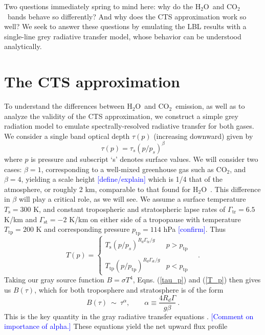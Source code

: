 \documentclass[10pt]{article}
\newcommand{\comment}[1]{\textcolor{blue}{[{#1}]}}
\newcommand{\beqn}{\begin{equation}}
\newcommand{\eeqn}{\end{equation}}
\newcommand{\eqnref}[1]{(\ref{#1})}
\newcommand{\cotwo}{\ensuremath{\mathrm{CO_2}}}
\newcommand{\htwo}{\ensuremath{\mathrm{H_2O}}}
\newcommand{\taus}{\ensuremath{\tau_s}}
\newcommand{\Ts}{\ensuremath{T_\mathrm{s}}}
\newcommand{\ps}{\ensuremath{p_s}}
\newcommand{\Ttp}{\ensuremath{T_\mathrm{tp}}}
\newcommand{\ptp}{\ensuremath{p_\mathrm{tp}}}
\newcommand{\gammatr}{\ensuremath{\Gamma_\mathrm{tr}}}
\newcommand{\gammast}{\ensuremath{\Gamma_\mathrm{st}}}
\begin{document}
Two questions immediately spring to mind here: why do the \htwo\ and \cotwo\ bands behave so differently? And why does the CTS approximation work so well? We seek to answer these questions by emulating the LBL results with a single-line grey radiative transfer model, whose behavior can be understood analytically. 

\section{The CTS approximation}
To understand the differences between \htwo\ and \cotwo\ emission, as well as to analyze the validity of the CTS approximation, we construct a simple grey radiation model to emulate spectrally-resolved radiative transfer for both gases. We consider a single band optical depth $\tau(p)$ (increasing downward) given by
\beqn
	\tau(p) = \taus(p/\ps)^\beta
	\label{tau_p}
\eeqn
where $p$ is pressure and subscript `s' denotes surface values. We will consider two cases: $\beta = 1$, corresponding to a well-mixed greenhouse gas such as  \cotwo, and $\beta = 4$, yielding a scale height \comment{define/explain} which is 1/4 that of the atmosphere, or roughly 2 km, comparable to that found for \htwo\   \citep{romps2014}. This difference in $\beta$ will play a critical role, as we will see. We assume a surface temperature $\Ts=300$ K, and constant tropospheric and stratospheric lapse rates of $\gammatr = 6.5$ K/km and $\gammast = -2$ K/km on either side of a tropopause with temperature $\Ttp=200$ K and corresponding  pressure $\ptp = 114$ hPa \comment{confirm}.  Thus  
\beqn
	T(p) = \left\{ \begin{array}{cc} \Ts(p/\ps)^{R_d \gammatr/g} & p > \ptp \\
																		 & \\
												 \Ttp(p/\ptp)^{R_d \gammast/g} & p < \ptp 
						\end{array} \right. \quad .
	\label{T_p}
\eeqn
Taking our gray source function $B=\sigma T^4$, Eqns. \eqnref{tau_p} and \eqnref{T_p} then gives us $B(\tau)$, which for both troposphere and stratosphere is of the form
\beqn
	B(\tau) \ \sim \  \tau^\alpha, \quad \quad \alpha \equiv \frac{4R_d\Gamma}{g\beta}\ .
	\label{B_tau}
\eeqn
This  is the key quantity in the gray radiative transfer equations \citep{pierrehumbert2010}.  \comment{Comment on importance of alpha.} These equations yield the net upward flux profile
\end{document}
